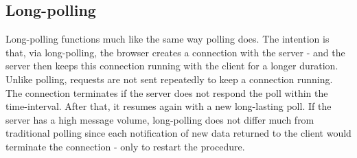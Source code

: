 \subsection{Long-polling}


Long-polling functions much like the same way polling does. The intention is that, via long-polling, the browser creates a connection with the server - and the server then keeps this connection running with the client for a longer duration\cite{lubbersgreco}. Unlike polling, requests are not sent repeatedly to keep a connection running\cite{lubbersgreco}. The connection terminates if the server does not respond the poll within the time-interval. After that, it resumes again with a new long-lasting poll\cite{lubbersgreco}. If the server has a high message volume, long-polling does not differ much from traditional polling since each notification of new data returned to the client would terminate the connection - only to restart the procedure\cite{lubbersgreco}.
